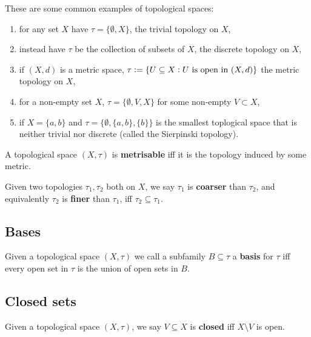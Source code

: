 \documentclass[../Year2.tex]{subfiles}
\begin{document}
\begin{examples}
    These are some common examples of topological spaces: \begin{enumerate}
        \item for any set $X$ have $\tau=\{\emptyset, X\}$, the trivial topology on $X$,
        \item instead have $\tau$ be the collection of subsets of $X$, the discrete topology on $X$,
        \item if $(X,d)$ is a metric space, $\tau:=\{U\subseteq X: U \ \black{is open in } (X,d)\}$ the metric topology on $X$,
        \item for a non-empty set $X$, $\tau=\{\emptyset,V,X\}$ for some non-empty $V\subset X$,
        \item if $X=\{a,b\}$ and $\tau=\{\emptyset,\{a,b\},\{b\}\}$ is the smallest toplogical space that is neither trivial nor discrete (called the Sierpinski topology).
    \end{enumerate}
\end{examples}

\begin{definition}[Metrisability]
    A topological space $(X,\tau)$ is \textbf{metrisable} iff it is the topology induced by some metric.
\end{definition}

\begin{definition}
    Given two topologies $\tau_1,\tau_2$ both on $X$, we say $\tau_1$ is \textbf{coarser} than $\tau_2$, and equivalently $\tau_2$ is \textbf{finer} than $\tau_1$, iff $\tau_2\subseteq\tau_1$.
\end{definition}

\subsection{Bases}

\begin{definition}[Basis]
    Given a topological space $(X,\tau)$ we call a subfamily $B\subseteq\tau$ a \textbf{basis} for $\tau$ iff every open set in $\tau$ is the union of open sets in $B$.
\end{definition}

\subsection{Closed sets}

\begin{definition}
    Given a topological space $(X,\tau)$, we say $V\subseteq X$ is \textbf{closed} iff $X\setminus V$ is open.
\end{definition}
\end{document}
